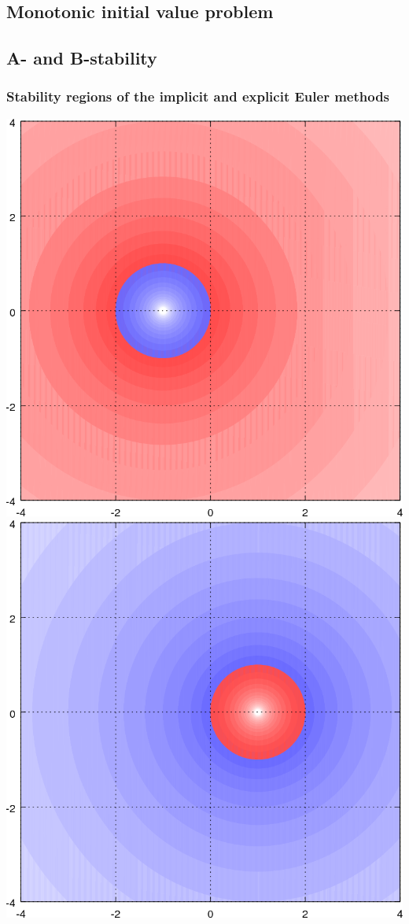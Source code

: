 \documentclass[ignorenonframetext,notheorems,aspectratio=1610]{beamer}
\begin{document}
\subsection{Monotonic initial value problem}
\frame{}
\frame{}
\frame{}
\frame{}
\subsection{A- and B-stability}
\frame{}
\begin{frame}
  \frametitle{Stability regions of the implicit and explicit Euler
    methods}
  \begin{center}
    \includegraphics[width=.47\textwidth]{fig/stability-euler}
    \includegraphics[width=.47\textwidth]{fig/stability-euler2}
  \end{center}
\end{frame}
\frame{
  }
\frame{
  }
\end{document}
